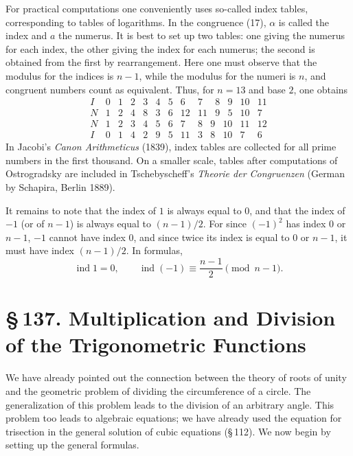 \documentclass[11pt]{article}
\providecommand{\sect}[2]{\section*{\S\,#1. #2}}
\begin{document}
For practical computations one conveniently uses so-called index tables, corresponding to tables of logarithms. In the congruence (17), $\alpha$ is called the index and $a$ the numerus. It is best to set up two tables: one giving the numerus for each index, the other giving the index for each numerus; the second is obtained from the first by rearrangement. Here one must observe that the modulus for the indices is $n-1$, while the modulus for the numeri is $n$, and congruent numbers count as equivalent. Thus, for $n=13$ and base $2$, one obtains
\[
\begin{array}{c|rrrrrrrrrrrr}
I&0&1&2&3&4&5&6&7&8&9&10&11\\\hline
N&1&2&4&8&3&6&12&11&9&5&10&7
\end{array}
\]
\[
\begin{array}{c|rrrrrrrrrrrr}
N&1&2&3&4&5&6&7&8&9&10&11&12\\\hline
I&0&1&4&2&9&5&11&3&8&10&7&6
\end{array}
\]
In Jacobi's \emph{Canon Arithmeticus} (1839), index tables are collected for all prime numbers in the first thousand. On a smaller scale, tables after computations of Ostrogradsky are included in Tschebyscheff's \emph{Theorie der Congruenzen} (German by Schapira, Berlin 1889).

It remains to note that the index of $1$ is always equal to $0$, and that the index of $-1$ (or of $n-1$) is always equal to $(n-1)/2$. For since $(-1)^2$ has index $0$ or $n-1$, $-1$ cannot have index $0$, and since twice its index is equal to $0$ or $n-1$, it must have index $(n-1)/2$. In formulas,
\[
\tag{21}       \operatorname{ind}1=0,
        \qquad \operatorname{ind}(-1)\equiv\frac{n-1}{2}\pmod{n-1}.
\]

\sect{137}{Multiplication and Division of the Trigonometric Functions}

We have already pointed out the connection between the theory of roots of unity and the geometric problem of dividing the circumference of a circle. The generalization of this problem leads to the division of an arbitrary angle. This problem too leads to algebraic equations; we have already used the equation for trisection in the general solution of cubic equations (\S\,112). We now begin by setting up the general formulas.
\end{document}
